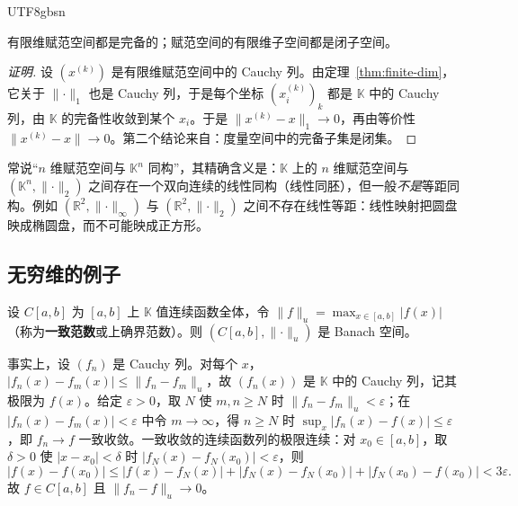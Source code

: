 \documentclass[11pt]{article}
\newcommand{\K}{\mathbb{K}}
\newcommand{\R}{\mathbb{R}}
\newcommand{\norm}[1]{\lVert #1\rVert}
\begin{document}
\begin{CJK*}{UTF8}{gbsn}
\begin{corollary}\label{cor:finite-complete}
有限维赋范空间都是完备的；赋范空间的有限维子空间都是闭子空间。
\end{corollary}

\begin{proof}[证明]
设 $(x^{(k)})$ 是有限维赋范空间中的 Cauchy 列。由定理~\ref{thm:finite-dim}，它关于 $\norm{\cdot}_{1}$ 也是 Cauchy 列，于是每个坐标 $(x^{(k)}_{i})_{k}$ 都是 $\K$ 中的 Cauchy 列，由 $\K$ 的完备性收敛到某个 $x_{i}$。于是 $\norm{x^{(k)}-x}_{1}\to0$，再由等价性 $\norm{x^{(k)}-x}\to0$。第二个结论来自：度量空间中的完备子集是闭集。
\end{proof}

\begin{remark}
常说“$n$ 维赋范空间与 $\K^{n}$ 同构”，其精确含义是：$\K$ 上的 $n$ 维赋范空间与 $(\K^{n},\norm{\cdot}_{2})$ 之间存在一个双向连续的线性同构（线性同胚），但一般\emph{不是}等距同构。例如 $(\R^{2},\norm{\cdot}_{\infty})$ 与 $(\R^{2},\norm{\cdot}_{2})$ 之间不存在线性等距：线性映射把圆盘映成椭圆盘，而不可能映成正方形。
\end{remark}

\subsection{无穷维的例子}

\begin{example}[{$C[a,b]$ 与上确界范数}]\label{ex:Cab}
设 $C[a,b]$ 为 $[a,b]$ 上 $\K$ 值连续函数全体，令 $\norm{f}_{u}=\max_{x\in[a,b]}|f(x)|$（称为\textbf{一致范数}或上确界范数）。则 $(C[a,b],\norm{\cdot}_{u})$ 是 Banach 空间。

事实上，设 $(f_{n})$ 是 Cauchy 列。对每个 $x$，$|f_{n}(x)-f_{m}(x)|\le\norm{f_{n}-f_{m}}_{u}$，故 $(f_{n}(x))$ 是 $\K$ 中的 Cauchy 列，记其极限为 $f(x)$。给定 $\varepsilon>0$，取 $N$ 使 $m,n\ge N$ 时 $\norm{f_{n}-f_{m}}_{u}<\varepsilon$；在 $|f_{n}(x)-f_{m}(x)|<\varepsilon$ 中令 $m\to\infty$，得 $n\ge N$ 时 $\sup_{x}|f_{n}(x)-f(x)|\le\varepsilon$，即 $f_{n}\to f$ 一致收敛。一致收敛的连续函数列的极限连续：对 $x_{0}\in[a,b]$，取 $\delta>0$ 使 $|x-x_{0}|<\delta$ 时 $|f_{N}(x)-f_{N}(x_{0})|<\varepsilon$，则
\[
|f(x)-f(x_{0})|\le|f(x)-f_{N}(x)|+|f_{N}(x)-f_{N}(x_{0})|+|f_{N}(x_{0})-f(x_{0})|<3\varepsilon .
\]
故 $f\in C[a,b]$ 且 $\norm{f_{n}-f}_{u}\to0$。
\end{example}


\end{CJK*}
\end{document}
